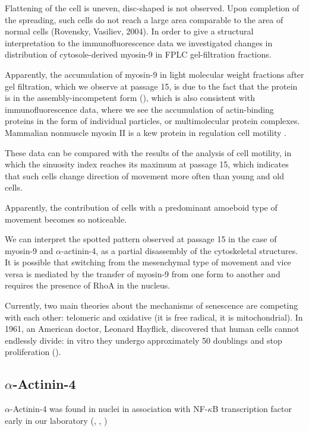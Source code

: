 \documentclass[alpha-refs]{wiley-article}
\begin{document}
Flattening of the cell is uneven, disc-shaped is not observed.
Upon completion of the spreading, such cells do not reach a large area comparable to the area of normal cells (Rovensky, Vasiliev, 2004).
In order to give a structural interpretation to the immunofluorescence data we investigated changes in distribution of cytosole-derived myosin-9 in FPLC gel-filtration fractions.

Apparently, the accumulation of myosin-9 in light molecular weight fractions after gel filtration, which we observe at passage 15, is due to the fact that the protein is in the assembly-incompetent form (\cite{vicente2009non}), which is also consistent with immunofluorescence data, where we see the accumulation of actin-binding proteins in the form of individual particles, or multimolecular protein complexes.
Mammalian nonmuscle myosin II is a kew protein in regulation cell motility \cite{shutova2018mammalian}.

These data can be compared with the results of the analysis of cell motility, in which the sinuosity index reaches its maximum at passage 15, which indicates that such cells change direction of movement more often than young and old cells.

Apparently, the contribution of cells with a predominant amoeboid type of movement becomes so noticeable.

We can interpret the spotted pattern observed at passage 15 in the case of myosin-9 and $\alpha$-actinin-4, as a partial disassembly of the cytoskeletal structures.
It is possible that switching from the mesenchymal type of movement and vice versa is mediated by the transfer of myosin-9 from one form to another and requires the presence of RhoA in the nucleus.

Currently, two main theories about the mechanisms of senescence are competing with each other: telomeric and oxidative (it is free radical, it is mitochondrial). In 1961, an American doctor, Leonard Hayflick, discovered that human cells cannot endlessly divide: in vitro they undergo approximately 50 doublings and stop proliferation (\cite{hayflick1961serial}).



\subsection*{$\alpha$-Actinin-4}

$\alpha$-Actinin-4 was found in nuclei in association with NF-$\kappa$B transcription factor early in our laboratory (\cite{babakov2008rela}, \cite{lomert2018co}, \cite{bolshakova2007extra})
\end{document}
